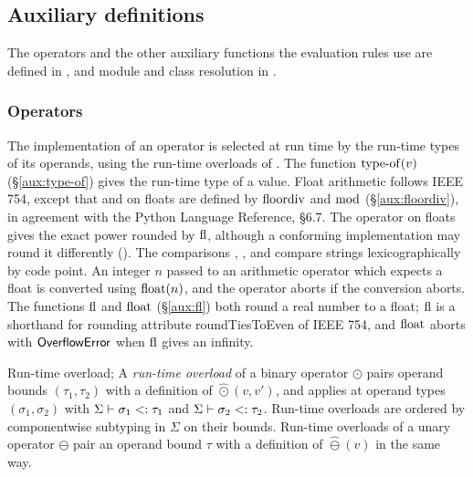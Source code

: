 \subsection{Auxiliary definitions}

The operators and the other auxiliary functions the evaluation rules use are defined in
, and module and class resolution in .

\subsubsection{Operators}\label{sec:run-time-overloads}



The implementation of an operator is selected at run time by the run-time types of its operands, using the
run-time overloads of . The function $\mathrm{type\text{-}of}(v)$ (\S\ref{aux:type-of}) gives the run-time
type of a value. Float arithmetic follows IEEE 754, except that \pyinline{//} and \pyinline{\%} on floats are defined by $\mathrm{floordiv}$ and $\mathrm{mod}$ (\S\ref{aux:floordiv}), in agreement with the Python Language Reference, \S6.7. The operator \pyinline{**} on floats gives the exact power rounded by $\mathrm{fl}$, although a conforming implementation may round it differently (). The comparisons \pyinline{<}, \pyinline{>}, \pyinline{<=} and \pyinline{>=} compare strings lexicographically by code point. An integer $n$ passed to an arithmetic operator which expects a float is converted using $\mathrm{float}(n)$, and the operator aborts if the conversion aborts. The functions $\mathrm{fl}$ and $\mathrm{float}$ (\S\ref{aux:fl}) both round a real number to a float; $\mathrm{fl}$ is a shorthand for rounding attribute roundTiesToEven of IEEE 754, and $\mathrm{float}$ aborts with $\mathsf{OverflowError}$ when $\mathrm{fl}$ gives an infinity.
\begin{specdefinition}{Run-time overload; }
A \emph{run-time overload} of a binary operator $\odot$ pairs operand bounds $(\tau_1, \tau_2)$ with a definition
of $\hat{\odot}(v, v')$, and applies at operand types
$(\sigma_1, \sigma_2)$ with $\Sigma \vdash \sigma_1 \mathrel{<:} \tau_1$ and $\Sigma \vdash \sigma_2 \mathrel{<:} \tau_2$.
Run-time overloads are ordered by componentwise subtyping in $\Sigma$ on their bounds.
Run-time overloads of a unary operator $\ominus$ pair an operand bound $\tau$ with a definition of $\hat{\ominus}(v)$ in
the same way.
\end{specdefinition}

